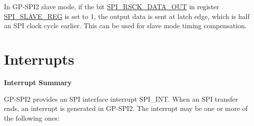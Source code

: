 \documentclass[main\_\_EN.tex]{subfiles}
\begin{document}
In GP-SPI2 slave mode, if the bit \hyperref[fielddesc:SPIRSCKDATAOUT]{SPI\_RSCK\_DATA\_OUT} in register \hyperref[regdesc:SPISLAVEREG]{SPI\_SLAVE\_REG} is set to 1, the output data is sent at latch edge, which is half an SPI clock cycle earlier. This can be used for slave mode timing compensation.


\section{Interrupts} \label{sec:spi-interrupts}

\textbf{Interrupt Summary}

GP-SPI2 provides an SPI interface interrupt SPI\_INT. When an SPI transfer ends, an interrupt is generated in GP-SPI2. The interrupt may be one or more of the following ones:
\end{document}
